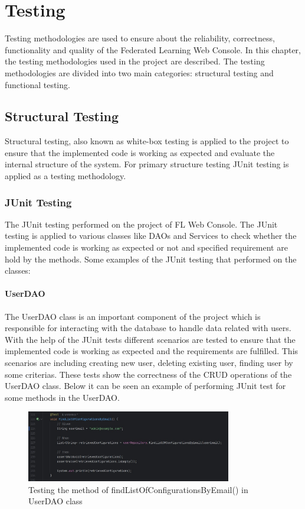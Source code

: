 \chapter{Testing}

Testing methodologies are used to ensure about the reliability, correctness, functionality and quality of the Federated Learning Web Console.
 In this chapter, the testing methodologies used in the project are described. The testing methodologies are divided into two main categories: structural testing and functional testing.

\section{Structural Testing}

Structural testing, also known as white-box testing is applied to the project to ensure that the implemented code is working as expected and evaluate the internal structure of the system.
For primary structure testing JUnit testing is applied as a testing methodology.

\subsection{JUnit Testing}

The JUnit testing performed on the project of FL Web Console. The JUnit testing is applied to various classes like DAOs and Services to check whether the implemented code is working as expected or not and specified
requirement are hold by the methods. Some examples of the JUnit testing that performed on the classes:

\subsubsection{UserDAO}
The UserDAO class is an important component of the project which is responsible for interacting with the database to handle data related with users. With the help of the JUnit tests
different scenarios are tested to ensure that the implemented code is working as expected and the requirements are fulfilled. This scenarios are including creating new user, deleting existing user, finding user by some criterias.
These tests show the correctness of the CRUD operations of the UserDAO class. Below it can be seen an example of performing JUnit test for some methods in the UserDAO.

\begin{figure}[ht!]
    \centering
    \includegraphics[width=0.8\textwidth]{images/5_testing/userdao-test}
    \caption{Testing the method of findListOfConfigurationsByEmail() in UserDAO class}
    \label{fig:u_dao_test}
\end{figure}

